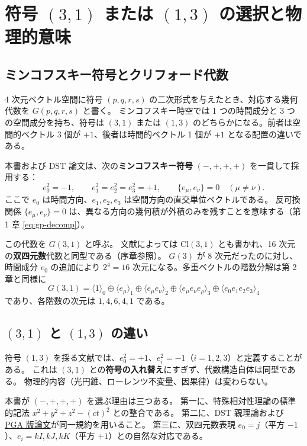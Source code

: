 \documentclass[dvipdfmx,a4paper,oneside]{jsbook}
\numberwithin{equation}{chapter}
\begin{document}
\section{\texorpdfstring{符号 \((3,1)\) または \((1,3)\) の選択と物理的意味}{符号 (3,1) または (1,3) の選択と物理的意味}}

\subsection{ミンコフスキー符号とクリフォード代数}

4 次元ベクトル空間に符号 \((p,q,r,s)\) の二次形式を与えたとき、対応する幾何代数を \(G(p,q,r,s)\) と書く。
ミンコフスキー時空では 1 つの時間成分と 3 つの空間成分を持ち、符号は \((3,1)\) または \((1,3)\) のどちらかになる。前者は空間的ベクトル 3 個が \(+1\)、後者は時間的ベクトル 1 個が \(+1\) となる配置の違いである。

本書および DST 論文は、次の\textbf{ミンコフスキー符号} \((-,+,+,+)\) を一貫して採用する：
\begin{equation}
  e_0^2 = -1, \qquad e_1^2 = e_2^2 = e_3^2 = +1, \qquad \{e_\mu, e_\nu\} = 0 \quad (\mu \neq \nu).
  \label{eq:minkowski-signature}
\end{equation}
ここで \(e_0\) は時間方向、\(e_1,e_2,e_3\) は空間方向の直交単位ベクトルである。
反可換関係 \(\{e_\mu,e_\nu\}=0\) は、異なる方向の幾何積が外積のみを残すことを意味する（第 1 章 \eqref{eq:gp-decomp}）。

この代数を \textbf{\(G(3,1)\)} と呼ぶ。
文献によっては \(\mathrm{Cl}(3,1)\) とも書かれ、16 次元の\textbf{双四元数}代数と同型である（序章参照）。
\(G(3)\) が 8 次元だったのに対し、時間成分 \(e_0\) の追加により \(2^4 = 16\) 次元になる。多重ベクトルの階数分解は第 2 章と同様に
\[
G(3,1) = \langle 1 \rangle_0 \oplus \langle e_\mu \rangle_1 \oplus \langle e_\mu e_\nu \rangle_2 \oplus \langle e_\mu e_\nu e_\rho \rangle_3 \oplus \langle e_0 e_1 e_2 e_3 \rangle_4
\]
であり、各階数の次元は \(1,4,6,4,1\) である。

\subsection{\((3,1)\) と \((1,3)\) の違い}

符号 \((1,3)\) を採る文献では、\(e_0^2 = +1\)、\(e_i^2 = -1\)（\(i=1,2,3\)）と定義することがある。
これは \((3,1)\) との\textbf{符号の入れ替え}にすぎず、代数構造自体は同型である。
物理的内容（光円錐、ローレンツ不変量、因果律）は変わらない。

本書が \((-,+,+,+)\) を選ぶ理由は三つある。
第一に、特殊相対性理論の標準的記法 \(x^2 + y^2 + z^2 - (ct)^2\) との整合である。
第二に、DST 親理論および \hyperref[sec:sister-manuscripts]{PGA 版論文}が同一規約を用いること。
第三に、双四元数表現 \(e_0 = j\)（平方 \(-1\)）、\(e_i = kI,kJ,kK\)（平方 \(+1\)）との自然な対応である。
\end{document}
